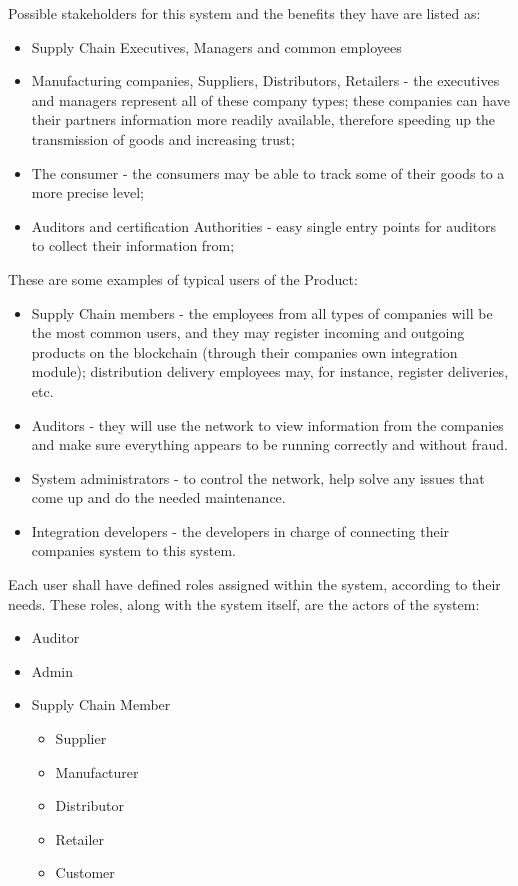 	 Possible stakeholders for this system and the benefits they have are listed as:
    \begin{itemize}
		\item Supply Chain Executives, Managers and common employees
			\item Manufacturing companies, Suppliers, Distributors, Retailers - the executives and managers represent all of these company types; these companies can have their partners information more readily available, therefore speeding up the transmission of goods and increasing trust;
		\item The consumer - the consumers may be able to track some of their goods to a more precise level;
		\item Auditors and certification Authorities - easy single entry points for auditors to collect their information from;
	\end{itemize}
	These are some examples of typical users of the Product:
	\begin{itemize}
		\item Supply Chain members - the employees from all types of companies will be the most common users, and they may register incoming and outgoing products on the blockchain (through their companies own integration module); distribution delivery employees may, for instance, register deliveries, etc.
		\item Auditors - they will use the network to view information from the companies and make sure everything appears to be running correctly and without fraud.
		\item System administrators - to control the network, help solve any issues that come up and do the needed maintenance.
		\item Integration developers - the developers in charge of connecting their companies system to this system.
	\end{itemize}
	Each user shall have defined roles assigned within the system, according to their needs. These roles, along with the system itself, are the actors of the system:
		\begin{itemize}
			\item Auditor
			\item Admin
			\item Supply Chain Member
			\begin{itemize}
				\item Supplier  %
				\item  Manufacturer
				\item Distributor
				\item Retailer
				\item Customer
		\end{itemize}
	\end{itemize}
